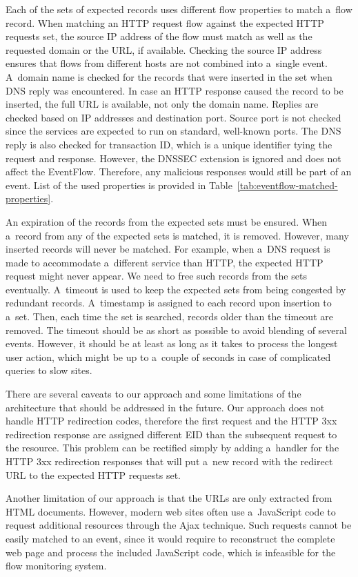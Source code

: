 Each of the sets of expected records uses different flow properties to match a~flow record. When matching an HTTP request flow against the expected HTTP requests set, the source IP address of the flow must match as well as the requested domain or the URL, if available. Checking the source IP address ensures that flows from different hosts are not combined into a~single event. A~domain name is checked for the records that were inserted in the set when DNS reply was encountered. In case an HTTP response caused the record to be inserted, the full URL is available, not only the domain name. Replies are checked based on IP addresses and destination port. Source port is not checked since  the services are expected to run on standard, well-known ports. The DNS reply is also checked for transaction ID, which is a unique identifier tying the request and response. However, the DNSSEC extension is ignored and does not affect the EventFlow. Therefore, any malicious responses would still be part of an event. List of the used properties is provided in Table~\ref{tab:eventflow-matched-properties}.

An expiration of the records from the expected sets must be ensured. When a~record from any of the expected sets is matched, it is removed. However, many inserted records will never be matched. For example, when a~DNS request is made to accommodate a~different service than HTTP, the expected HTTP request might never appear. We need to free such records from the sets eventually. A~timeout is used to keep the expected sets from being congested by redundant records. A~timestamp is assigned to each record upon insertion to a~set. Then, each time the set is searched, records older than the timeout are removed. The timeout should be as short as possible to avoid blending of several events. However, it should be at least as long as it takes to process the longest user action, which might be up to a~couple of seconds in case of complicated queries to slow sites.

There are several caveats to our approach and some limitations of the architecture that should be addressed in the future. Our approach does not handle HTTP redirection codes, therefore the first request and the HTTP 3xx redirection response are assigned different EID than the subsequent request to the resource. This problem can be rectified simply by adding a~handler for the HTTP 3xx redirection responses that will put a~new record with the redirect URL to the expected HTTP requests set.

Another limitation of our approach is that the URLs are only extracted from HTML documents. However, modern web sites often use a~JavaScript code to request additional resources through the Ajax technique. Such requests cannot be easily matched to an event, since it would require to reconstruct the complete web page and process the included JavaScript code, which is infeasible for the flow monitoring system.

